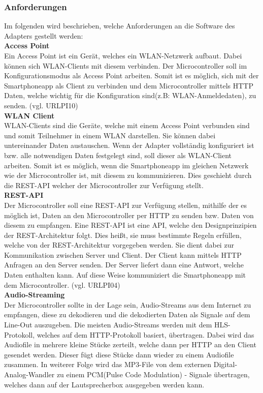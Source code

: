 \documentclass[]{article}
\begin{document}
\subsubsection{Anforderungen}
Im folgenden wird beschrieben, welche Anforderungen an die Software des Adapters gestellt werden: \newline \\
\textbf{Access Point} \\
Ein Access Point ist ein Gerät, welches ein WLAN-Netzwerk aufbaut. Dabei können sich WLAN-Clients mit diesem verbinden.
Der Microcontroller soll im Konfigurationsmodus als Access Point arbeiten. Somit ist es möglich, sich mit der Smartphoneapp als Client zu verbinden und dem Microcontroller mittels HTTP Daten, welche wichtig für die Konfiguration sind(z.B: WLAN-Anmeldedaten), zu senden.  (vgl. URLPI10) \newline \\
\textbf{WLAN Client} \\
WLAN-Clients sind die Geräte, welche mit einem Access Point verbunden sind und somit Teilnehmer in einem WLAN darstellen. Sie können dabei untereinander Daten austauschen.
Wenn der Adapter vollständig konfiguriert ist bzw. alle notwendigen Daten festgelegt sind, soll dieser als WLAN-Client arbeiten. Somit ist es möglich, wenn die Smartphoneapp im gleichen Netzwerk wie der Microcontroller ist, mit diesem zu kommunizieren. Dies geschieht durch die REST-API welcher der Microcontroller zur Verfügung stellt. \newline \\
\textbf{REST-API} \\
Der Microcontroller soll eine REST-API zur Verfügung stellen, mithilfe der es möglich ist, Daten an den Microcontroller per HTTP zu senden bzw. Daten von diesem zu empfangen. Eine REST-API ist eine API, welche den Designprinzipien der REST-Architektur folgt. Dies heißt, sie muss bestimmte Regeln erfüllen, welche von der REST-Architektur vorgegeben werden. Sie dient dabei zur Kommunikation zwischen Server und Client. Der Client kann mittels HTTP Anfragen an den Server senden. Der Server liefert dann eine Antwort, welche Daten enthalten kann. Auf diese Weise kommuniziert die Smartphoneapp mit dem Microcontroller. (vgl. URLPI04) \newline \\
\textbf{Audio-Streaming} \\
Der Microcontroller sollte in der Lage sein, Audio-Streams aus dem Internet zu empfangen, diese zu dekodieren und die dekodierten Daten als Signale auf dem Line-Out auszugeben. Die meisten Audio-Streams werden mit dem HLS-Protokoll, welches auf dem HTTP-Protokoll basiert, übertragen. Dabei wird das Audiofile in mehrere kleine Stücke zerteilt, welche dann per HTTP an den Client gesendet werden. Dieser fügt diese Stücke dann wieder zu einem Audiofile zusammen. In weiterer Folge wird das MP3-File von dem externen Digital-Analog-Wandler zu einem PCM(\glqq Pulse Code Modulation\grqq{}) - Signale übertragen, welches dann auf der Lautsprecherbox ausgegeben werden kann.
\end{document}
